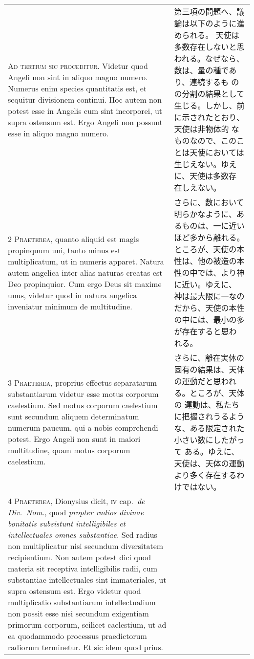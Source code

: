 \documentclass[10pt]{jsarticle} %
\begin{document}
\begin{longtable}{p{21em}p{21em}}

{\huge A}{\scshape d tertium sic proceditur}. Videtur quod
Angeli non sint in aliquo magno numero. Numerus enim species quantitatis
est, et sequitur divisionem continui. Hoc autem non potest esse in
Angelis cum sint incorporei, ut supra ostensum est. Ergo Angeli non
possunt esse in aliquo magno numero.


&

第三項の問題へ、議論は以下のように進められる。
天使は多数存在しないと思われる。なぜなら、数は、量の種であり、連続するも
 のの分割の結果として生じる。しかし、前に示されたとおり、天使は非物体的
 なものなので、このことは天使においては生じえない。ゆえに、天使は多数存
 在しえない。

\\


{\scshape 2 Praeterea}, quanto aliquid est magis
propinquum uni, tanto minus est multiplicatum, ut in numeris
apparet. Natura autem angelica inter alias naturas creatas est Deo
propinquior. Cum ergo Deus sit maxime unus, videtur quod in natura
angelica inveniatur minimum de multitudine.


&
さらに、数において明らかなように、あるものは、一に近いほど多から離れる。
 ところが、天使の本性は、他の被造の本性の中では、より神に近い。ゆえに、
 神は最大限に一なのだから、天使の本性の中には、最小の多が存在すると思わ
 れる。
\\


{\scshape 3 Praeterea}, proprius effectus separatarum
substantiarum videtur esse motus corporum caelestium. Sed motus corporum
caelestium sunt secundum aliquem determinatum numerum paucum, qui a
nobis comprehendi potest. Ergo Angeli non sunt in maiori multitudine,
quam motus corporum caelestium.


&


さらに、離在実体の固有の結果は、天体の運動だと思われる。ところが、天体の
 運動は、私たちに把握されうるような、ある限定された小さい数にしたがって
 ある。ゆえに、天使は、天体の運動より多く存在するわけではない。

\\


{\scshape 4 Praeterea}, Dionysius dicit, {\scshape iv} cap.~{\itshape de
Div.~Nom}., quod {\itshape propter radios divinae bonitatis subsistunt
intelligibiles et intellectuales omnes substantiae}. Sed radius non
multiplicatur nisi secundum diversitatem recipientium. Non autem potest
dici quod materia sit receptiva intelligibilis radii, cum substantiae
intellectuales sint immateriales, ut supra ostensum est. Ergo videtur
quod multiplicatio substantiarum intellectualium non possit esse nisi
secundum exigentiam primorum corporum, scilicet caelestium, ut ad ea
quodammodo processus praedictorum radiorum terminetur. Et sic idem quod
prius.



\end{longtable}
\end{document}
